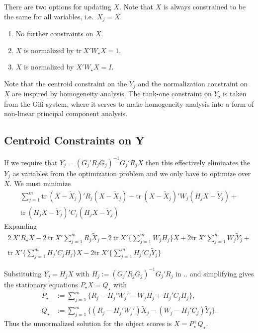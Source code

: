 \documentclass[
  12pt,
]{article}
\providecommand{\tightlist}{%
  \setlength{\itemsep}{0pt}\setlength{\parskip}{0pt}}
\begin{document}
There are two options for updating \(X\). Note that \(X\) is always
constrained to be the same for all variables, i.e.~\(X_j=X\).

\begin{enumerate}
\def\labelenumi{\arabic{enumi}.}
\setcounter{enumi}{-1}
\tightlist
\item
  No further constraints on \(X\).
\item
  \(X\) is normalized by \(\text{tr}\ X'W_\star X=1\).
\item
  \(X\) is normalized by \(X'W_\star X=I\).
\end{enumerate}

Note that the centroid constraint on the \(Y_j\) and the normalization
constraint on \(X\) are inspired by homogeneity analysis. The rank-one
constraint on \(Y_j\) is taken from the Gifi system, where it serves
to make homogeneity analysis into a form of non-linear principal
component analysis.

\subsection{Centroid Constraints on Y}\label{centroid-constraints-on-y}

If we require that \(Y_j=(G_j'R_jG_j)^{-1}G_j'R_jX\) then this effectively eliminates the \(Y_j\) as variables from the optimization problem and we only have to optimize over \(X\). We must minimize
\begin{multline}
\sum_{j=1}^m\text{tr}\ (X-\tilde X_j)'R_j(X-\tilde X_j) -
\text{tr}\ (X-\tilde X_j)'W_j(H_jX-\tilde Y_j)+\\
\text{tr}\ (H_jX-\tilde Y_j)'C_j(H_jX-\tilde Y_j)
\end{multline}
Expanding
\begin{multline}
2\ X'R_\star X-2\ \text{tr}\ X'\sum_{j=1}^mR_j\tilde X_j-2\ \text{tr}\ X'\{\sum_{j=1}^mW_jH_j\}X + 2\text{tr}\ X'\sum_{j=1}^mW_j\tilde Y_j+\\
\text{tr}\ X'\{\sum_{j=1}^mH_j'C_jH_j\}X-2\text{tr}\ X'\{\sum_{j=1}^mH_j'C_j\tilde Y_j\}
\end{multline}

Substituting \(Y_j=H_jX\) with \(H_j:=(G_j'R_jG_j)^{-1}G_j'R_j\) in .. and simplifying gives
the stationary equations \(P_\star X= Q_\star\) with
\begin{subequations}
\begin{align}
P_\star&:=\sum_{j=1}^m\{R_j-H_j'W_j'-W_jH_j+H_j'C_jH_j\},\\
Q_\star&:=\sum_{j=1}^m\{(R_j-H_j'W_j')\tilde X_j-(W_j-H_j'C_j)\tilde Y_j\}.
\end{align}
\end{subequations}
Thus the unnormalized solution for the object scores is \(X=P^+_\star Q_\star\).
\end{document}
